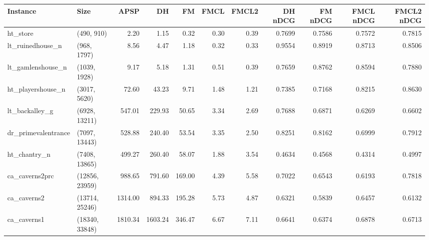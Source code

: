 \begin{tabular}{llrrrrrrrrr}
\toprule
           Instance &           Size &    APSP &      DH &     FM &  FMCL &  FMCL2 &  DH nDCG &  FM nDCG &  FMCL nDCG &  FMCL2 nDCG \\
\midrule
           ht\_store &     (490, 910) &    2.20 &    1.15 &   0.32 &  0.30 &   0.39 &   0.7699 &   0.7586 &     0.7572 &      0.7815 \\
   lt\_ruinedhouse\_n &    (968, 1797) &    8.56 &    4.47 &   1.18 &  0.32 &   0.33 &   0.9554 &   0.8919 &     0.8713 &      0.8506 \\
  lt\_gamlenshouse\_n &   (1039, 1928) &    9.17 &    5.18 &   1.31 &  0.51 &   0.39 &   0.7659 &   0.8762 &     0.8594 &      0.7880 \\
  ht\_playershouse\_n &   (3017, 5620) &   72.60 &   43.23 &   9.71 &  1.48 &   1.21 &   0.7385 &   0.7168 &     0.8215 &      0.8630 \\
     lt\_backalley\_g &  (6928, 13211) &  547.01 &  229.93 &  50.65 &  3.34 &   2.69 &   0.7688 &   0.6871 &     0.6269 &      0.6602 \\
dr\_primevalentrance &  (7097, 13443) &  528.88 &  240.40 &  53.54 &  3.35 &   2.50 &   0.8251 &   0.8162 &     0.6999 &      0.7912 \\
       ht\_chantry\_n &  (7408, 13865) &  499.27 &  260.40 &  58.07 &  1.88 &   3.54 &   0.4634 &   0.4568 &     0.4314 &      0.4997 \\
     ca\_caverns2prc & (12856, 23959) &  988.65 &  791.60 & 169.00 &  4.39 &   5.58 &   0.7022 &   0.6543 &     0.6193 &      0.7818 \\
        ca\_caverns2 & (13714, 25246) & 1314.00 &  894.33 & 195.28 &  5.73 &   4.87 &   0.6321 &   0.5839 &     0.6457 &      0.6132 \\
        ca\_caverns1 & (18340, 33848) & 1810.34 & 1603.24 & 346.47 &  6.67 &   7.11 &   0.6641 &   0.6374 &     0.6878 &      0.6713 \\
\bottomrule
\end{tabular}
